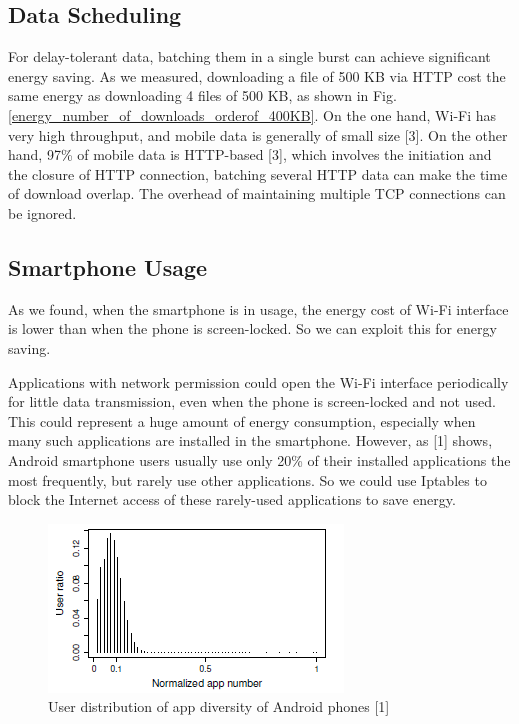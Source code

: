 \documentclass[journal]{IEEEtran}
\begin{document}
\subsection{Data Scheduling}
For delay-tolerant data, batching them in a single burst can achieve significant energy saving. 
As we measured, downloading a file of 500 KB via HTTP cost the same energy as downloading 
4 files of 500 KB, as shown in Fig. \ref{energy_number_of_downloads_orderof_400KB}. On the one hand, Wi-Fi has very high throughput, and mobile data is generally of 
small size [3]. On the other hand, 97\% of mobile data is HTTP-based [3], 
which involves the initiation and the closure of HTTP connection, batching several 
HTTP data can make the time of download overlap. The overhead of maintaining multiple TCP connections
can be ignored.
\subsection{Smartphone Usage}
As we found, when the smartphone is in usage, the energy cost of Wi-Fi interface is lower than when the phone 
is screen-locked. So we can exploit this for energy saving.

Applications with network permission could open the Wi-Fi interface periodically for little data transmission, even when the phone is screen-locked and not used. This could represent a huge amount of energy consumption, especially when many such applications are installed in the smartphone.
However, as [1] shows, Android smartphone users usually use only 20\% of their installed applications the most frequently, but rarely use other applications.
So we could use Iptables to block the Internet access of these rarely-used applications to save energy.

\begin{figure}
\centering
\includegraphics[scale=0.95]{application_utilisation_android.png}
\caption{User distribution of app diversity of Android phones [1]}
\label{application_utilisation_android}
\end{figure}
\end{document}
